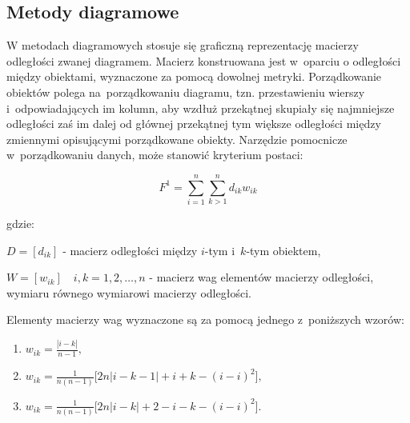 \documentclass[12pt,a4paper]{report}
\begin{document}
\subsection{Metody diagramowe}


W metodach diagramowych stosuje się graficzną reprezentację macierzy odległości zwanej diagramem. Macierz konstruowana jest w~oparciu o odległości między obiektami, wyznaczone za pomocą dowolnej metryki. Porządkowanie obiektów polega na~porządkowaniu diagramu, tzn. przestawieniu wierszy i~odpowiadających im kolumn, aby wzdłuż przekątnej skupiały się najmniejsze odległości zaś im dalej od głównej przekątnej tym większe odległości między zmiennymi opisującymi porządkowane obiekty.  %
Narzędzie pomocnicze w~porządkowaniu danych, może stanowić kryterium postaci:


$$
F^1= \sum_{i=1}^{n} \sum_{k>1}^{n} d_{ik}w_{ik}
$$

gdzie:

$D=[d_{ik}]$ - macierz odległości między $i$-tym i~$k$-tym obiektem,
 
$W=[w_{ik}] \quad i,k=1, 2, \ldots, n$ - macierz wag elementów macierzy odległości, wymiaru równego wymiarowi macierzy odległości.
 

Elementy macierzy wag wyznaczone są za pomocą jednego z~poniższych wzorów:
\begin{enumerate}[label=(\alph*)]
\item $w_{ik}=\frac{| i-k |}{n-1}, \qquad$
\item $w_{ik}=\frac{1}{n(n-1)}\lbrack{2n|i-k-1|+i+k-(i-i)^2\rbrack},$
\item $w_{ik}=\frac{1}{n(n-1)}\lbrack{2n|i-k|+2-i-k-(i-i)^2\rbrack}.$
\end{enumerate}
%
% 
\end{document}
